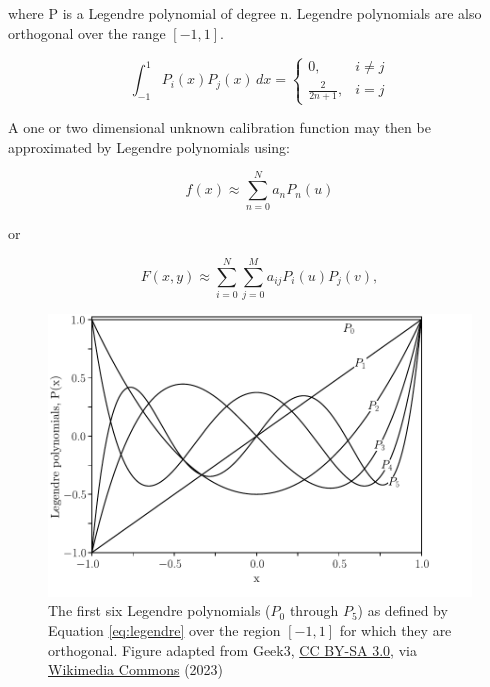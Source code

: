 \noindent where P is a Legendre polynomial of degree n. Legendre polynomials are also orthogonal over the range $[-1, 1]$.
\prgph

\begin{equation}
    \int_{-1}^{1} P_{i}(x) P_{j}(x) \,dx =
    \begin{cases}
        0,                 & i \neq j\\
        \frac{2}{2 n + 1}, & i = j
    \end{cases}
    \label{eq:legorth}
\end{equation}

A one or two dimensional unknown calibration function may then be approximated by Legendre polynomials using:

\begin{equation}
    f(x) \approx \sum_{n = 0}^{N} a_{n} P_{n}(u)
    \label{eq:legendre}
\end{equation}

\noindent or

\begin{equation}
    F(x, y) \approx \sum_{i = 0}^{N} \sum_{j = 0}^{M} a_{ij} P_{i}(u) P_{j}(v),
    \label{eq:Legendre2D}
\end{equation}

\begin{figure}[t]
    \centering
    \includegraphics[width = 12cm]{figures/2_legendre.pdf}
    \caption{The first six Legendre polynomials ($P_0$ through $P_{5}$) as defined by Equation \ref{eq:legendre} over the region $[-1, 1]$ for which they are orthogonal. Figure adapted from Geek3, \protect\href{https://creativecommons.org/licenses/by-sa/3.0}{CC BY-SA 3.0}, via \protect\href{https://commons.wikimedia.org/wiki/File:Legendrepolynomials6.svg}{Wikimedia Commons} (2023)}
    \label{fig:legendre}
\end{figure}

